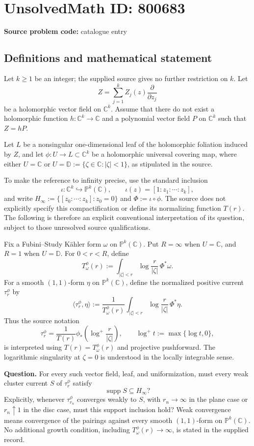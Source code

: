 \documentclass[11pt]{article}
\newcommand{\C}{\mathbb{C}}
\newcommand{\PP}{\mathbb{P}}
\begin{document}
\section*{UnsolvedMath ID: 800683}
\textbf{Source problem code:} catalogue entry
\subsection{Definitions and mathematical statement}
Let \(k\geq 1\) be an integer; the supplied source gives no further restriction on \(k\). Let
\[
Z=\sum_{j=1}^{k} Z_j(z)\frac{\partial}{\partial z_j}
\]
be a holomorphic vector field on \(\C^k\). Assume that there do not exist a holomorphic function \(h:\C^k\to\C\) and a polynomial vector field \(P\) on \(\C^k\) such that \(Z=hP\).

Let \(L\) be a nonsingular one-dimensional leaf of the holomorphic foliation induced by \(Z\), and let \(\phi:U\to L\subset\C^k\) be a holomorphic universal covering map, where either \(U=\C\) or \(U=\mathbb D:=\{\zeta\in\C:|\zeta|<1\}\), as stipulated in the source.

To make the reference to infinity precise, use the standard inclusion
\[
\iota:\C^k\hookrightarrow\PP^k(\C),\qquad
\iota(z)=[1:z_1:\cdots:z_k],
\]
and write \(H_\infty:=\{[z_0:\cdots:z_k]:z_0=0\}\) and \(\Phi:=\iota\circ\phi\). The source does not explicitly specify this compactification or define its normalizing function \(T(r)\). The following is therefore an explicit conventional interpretation of its question, subject to those unresolved source qualifications.

Fix a Fubini--Study K\"ahler form \(\omega\) on \(\PP^k(\C)\). Put \(R=\infty\) when \(U=\C\), and \(R=1\) when \(U=\mathbb D\). For \(0<r<R\), define
\[
T_\omega^\phi(r)
:=\int_{|\zeta|<r}\log\frac{r}{|\zeta|}\,\Phi^*\omega.
\]
For a smooth \((1,1)\)-form \(\eta\) on \(\PP^k(\C)\), define the normalized positive current \(\tau_r^\phi\) by
\[
\langle\tau_r^\phi,\eta\rangle
:=\frac{1}{T_\omega^\phi(r)}
\int_{|\zeta|<r}\log\frac{r}{|\zeta|}\,\Phi^*\eta.
\]
Thus the source notation
\[
\tau_r^\phi=\frac{1}{T(r)}\phi_*\!\left(\log^+\frac{r}{|\zeta|}\right),
\qquad \log^+t:=\max\{\log t,0\},
\]
is interpreted using \(T(r)=T_\omega^\phi(r)\) and projective pushforward. The logarithmic singularity at \(\zeta=0\) is understood in the locally integrable sense.

\textbf{Question.} For every such vector field, leaf, and uniformization, must every weak cluster current \(S\) of \(\tau_r^\phi\) satisfy
\[
\operatorname{supp}S\subseteq H_\infty?
\]
Explicitly, whenever \(\tau_{r_n}^\phi\) converges weakly to \(S\), with \(r_n\to\infty\) in the plane case or \(r_n\uparrow1\) in the disc case, must this support inclusion hold? Weak convergence means convergence of the pairings against every smooth \((1,1)\)-form on \(\PP^k(\C)\). No additional growth condition, including \(T_\omega^\phi(r)\to\infty\), is stated in the supplied record.
\end{document}
